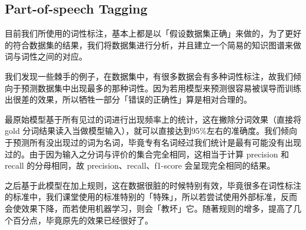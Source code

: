 
\subsection{Part-of-speech Tagging}
\label{sec:pos}

目前我们所使用的词性标注，基本上都是以「假设数据集正确」来做的，为了更好的符合数据集的结果，我们将数据集进行分析，并且建立一个简易的知识图谱来做词与词性之间的对应。

我们发现一些棘手的例子，在数据集中，有很多数据会有多种词性标注，故我们倾向于预测数据集中出现最多的那种词性。因为若用模型来预测很容易被误导而训练出很差的效果，所以牺牲一部分「错误的正确性」算是相对合理的。

最原始模型基于所有见过的词进行出现频率上的统计，这在撇除分词效果（直接将 gold 分词结果读入当做模型输入），就可以直接达到95\%左右的准确度。我们倾向于预测所有没出现过的词为名词，毕竟专有名词经过我们统计是最有可能没有出现过的。由于因为输入之分词与评价的集合完全相同，这相当于计算 precision 和 recall 的分母相同，故 precision、recall、f1-score 会呈现完全相同的结果。

之后基于此模型在加上规则，这在数据很脏的时候特别有效，毕竟很多在词性标注的标准中，我们课堂使用的标准特别的「特殊」，所以若尝试使用外部标准，反而会使效果下降，而若使用机器学习，则会「教坏」它。随著规则的增多，提高了几个百分点，毕竟原先的效果已经很好了。
